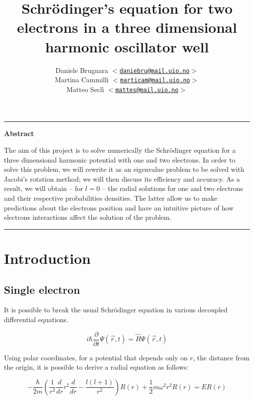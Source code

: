 \documentclass {article}
\author{
\normalsize Daniele Brugnara \texttt{$<$\href{mailto:daniebru@mail.uio.no}
{daniebru@mail.uio.no}$>$}\\
\normalsize Martina Cammilli \texttt{$<$\href{mailto:marticam@mail.uio.no}
{marticam@mail.uio.no}$>$}\\
\normalsize Matteo Seclì \texttt{$<$\href{mailto:mattes@mail.uio.no}
{mattes@mail.uio.no}$>$}\\
}
\title{\textbf{Schrödinger's equation for two electrons in a three dimensional harmonic oscillator well}}
\begin{document}
\maketitle

\hrule
\begin{center}
	\large\textbf{Abstract}
	\medskip\\
	\begin{minipage}[c][][c]{0.8\textwidth}
		\small{
			The aim of this project is to solve numerically the Schrödinger equation for a three dimensional harmonic potential with one and two electrons. In order to solve this problem, we will rewrite it as an eigenvalue problem to be solved with Jacobi's rotation method; we will then discuss its efficiency and accuracy. As a result, we will obtain -- for $l=0$ -- the radial solutions for one and two electrons and their respective probabilities densities. The latter allow us to make predictions about the electrons position and have an intuitive picture of how electrons interactions affect the solution of the problem.}
	\end{minipage}
\end{center}
\medskip
\hrule

\tableofcontents

\section{Introduction}

\subsection{Single electron}

It is possible to break the usual Schrödinger equation in various decoupled differential equations.

\begin{equation}
i \hbar \frac{\partial}{\partial t} \Psi(\vec{r}, t)= \hat{H} \Psi(\vec{r}, t)
\end{equation}

Using polar coordinates, for a potential that depends only on $r$, the distance from the origin, it is possible to derive a radial equation as follows:

\begin{equation}
-\frac{\hbar}{2m} \left( \frac{1}{r^2}\frac{d}{dr}r^2 \frac{d}{dr}-\frac{l(l+1)}{r^2} \right) R(r)+ \frac{1}{2} m \omega^2 r^2 R(r)=E R(r)
\label{diffeq}
\end{equation}
\end{document}

